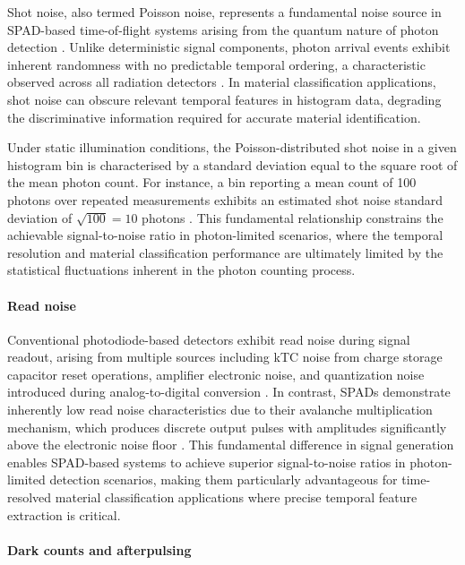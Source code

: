 \documentclass[12pt,a4paper,oneside]{report}
\begin{document}
Shot noise, also termed Poisson noise, represents a fundamental noise source in SPAD-based time-of-flight systems arising from the quantum nature of photon detection \cite{piron2020}. Unlike deterministic signal components, photon arrival events exhibit inherent randomness with no predictable temporal ordering, a characteristic observed across all radiation detectors \cite{bass2010}. In material classification applications, shot noise can obscure relevant temporal features in histogram data, degrading the discriminative information required for accurate material identification.

Under static illumination conditions, the Poisson-distributed shot noise in a given histogram bin is characterised by a standard deviation equal to the square root of the mean photon count. For instance, a bin reporting a mean count of 100 photons over repeated measurements exhibits an estimated shot noise standard deviation of $\sqrt{100} = 10$ photons \cite{bass2010}. This fundamental relationship constrains the achievable signal-to-noise ratio in photon-limited scenarios, where the temporal resolution and material classification performance are ultimately limited by the statistical fluctuations inherent in the photon counting process.

\paragraph{Read noise}
\label{par:read_noise}

Conventional photodiode-based detectors exhibit read noise during signal readout, arising from multiple sources including kTC noise from charge storage capacitor reset operations, amplifier electronic noise, and quantization noise introduced during analog-to-digital conversion \cite{bass2010}. In contrast, SPADs demonstrate inherently low read noise characteristics due to their avalanche multiplication mechanism, which produces discrete output pulses with amplitudes significantly above the electronic noise floor \cite{piron2020}. This fundamental difference in signal generation enables SPAD-based systems to achieve superior signal-to-noise ratios in photon-limited detection scenarios, making them particularly advantageous for time-resolved material classification applications where precise temporal feature extraction is critical.

\paragraph{Dark counts and afterpulsing}
\label{par:dark_counts_and_afterpulsing}
\end{document}
